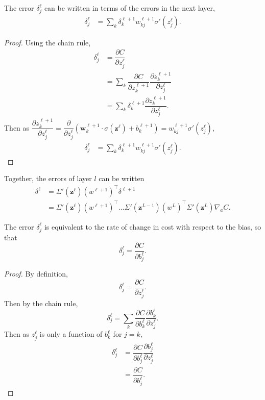 \begin{proposition}
	The error $\delta^\ell_j$ can be written in terms of the errors in the next layer, 
	\begin{align*}
		\delta_j^\ell & = \sum_k\delta_k^{\ell+1}w_{kj}^{\ell+1}\sigma'(z_j^\ell).
	\end{align*}
\end{proposition}

\begin{proof}
	Using the chain rule,
	\begin{align*}
		\delta_j^\ell & = \dfrac{\partial C}{\partial z_j^\ell} \\
		& = \sum_k\dfrac{\partial C}{\partial z_k^{\ell+1}}\dfrac{\partial z_k^{\ell+1}}{\partial z_j^\ell} \\
		& = \sum_k\delta_k^{\ell+1}\dfrac{\partial z_k^{\ell+1}}{\partial z_j^\ell}.
	\end{align*}
	Then as $\dfrac{\partial z_k^{\ell+1}}{\partial z_j^\ell} = \dfrac{\partial}{\partial z_j^\ell}(\mathbf{w}_k^{\ell+1}\cdot\sigma(\mathbf{z}^\ell) + b_k^{\ell+1}) = w_{kj}^{\ell+1}\sigma'(z_j^\ell)$,
	\begin{align*}
		\delta_j^\ell & = \sum_k\delta_k^{\ell+1}w_{kj}^{\ell+1}\sigma'(z_j^\ell).
	\end{align*}
\end{proof}


Together, the errors of layer $l$ can be written
\begin{align*}
	\delta^\ell & = \Sigma'(\mathbf{z}^\ell)(w^{\ell+1})^\intercal\delta^{\ell+1} \\
	& = \Sigma'(\mathbf{z}^\ell)(w^{\ell+1})^\intercal\ldots\Sigma'(\mathbf{z}^{L-1})(w^L)^\intercal\Sigma'(\mathbf{z}^L)\nabla_aC.
\end{align*}

\begin{proposition}
	The error $\delta_j^\ell$ is equivalent to the rate of change in cost with respect to the bias, so that
	\[
		\delta_j^\ell = \dfrac{\partial C}{\partial b_j^\ell}.
	\]
\end{proposition}
\begin{proof}
	By definition,
	\[
		\delta_j^\ell = \dfrac{\partial C}{\partial z_j^\ell}.
	\]
	Then by the chain rule,
	\[
		\delta_j^\ell = \sum_k\dfrac{\partial C}{\partial b_k^\ell}\dfrac{\partial b_k^\ell}{\partial z_j^\ell}.
	\]
	Then as $z_j^\ell$ is only a function of $b_k^\ell$ for $j = k$,
	\begin{align*}
		\delta_j^\ell & = \dfrac{\partial C}{\partial b_j^\ell}\dfrac{\partial b_j^\ell}{\partial z_j^\ell} \\
		& = \dfrac{\partial C}{\partial b_j^\ell}.
	\end{align*}
\end{proof}

